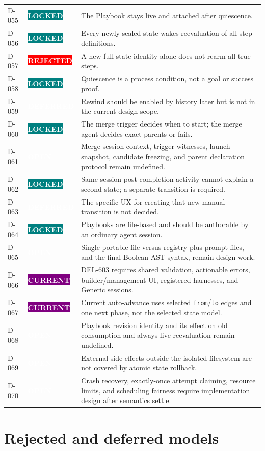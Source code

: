 \documentclass[11pt]{article}
\newcommand{\statuspill}[2]{%
  \begingroup\setlength{\fboxsep}{3pt}%
  \colorbox{#1}{\textcolor{white}{\sffamily\bfseries\scriptsize #2}}%
  \endgroup}
\newcommand{\Locked}{\statuspill{Teal}{LOCKED}}
\newcommand{\Current}{\statuspill{Purple}{CURRENT}}
\newcommand{\Open}{\statuspill{Amber}{OPEN}}
\newcommand{\Deferred}{\statuspill{Muted}{DEFERRED}}
\newcommand{\Rejected}{\statuspill{Red}{REJECTED}}
\begin{document}
\begin{longtable}{@{}L{0.52in}L{0.88in}L{5.10in}@{}}
D-055 & \Locked & The Playbook stays live and attached after quiescence. \\
D-056 & \Locked & Every newly sealed state wakes reevaluation of all step definitions. \\
D-057 & \Rejected & A new full-state identity alone does not rearm all true steps. \\
D-058 & \Locked & Quiescence is a process condition, not a goal or success proof. \\
D-059 & \Deferred & Rewind should be enabled by history later but is not in the current design scope. \\
D-060 & \Locked & The merge trigger decides when to start; the merge agent decides exact parents or fails. \\
D-061 & \Open & Merge session context, trigger witnesses, launch snapshot, candidate freezing, and parent declaration protocol remain undefined. \\
D-062 & \Locked & Same-session post-completion activity cannot explain a second state; a separate transition is required. \\
D-063 & \Deferred & The specific UX for creating that new manual transition is not decided. \\
D-064 & \Locked & Playbooks are file-based and should be authorable by an ordinary agent session. \\
D-065 & \Open & Single portable file versus registry plus prompt files, and the final Boolean AST syntax, remain design work. \\
D-066 & \Current & DEL-603 requires shared validation, actionable errors, builder/management UI, registered harnesses, and Generic sessions. \\
D-067 & \Current & Current auto-advance uses selected \texttt{from}/\texttt{to} edges and one next phase, not the selected state model. \\
D-068 & \Open & Playbook revision identity and its effect on old consumption and always-live reevaluation remain undefined. \\
D-069 & \Open & External side effects outside the isolated filesystem are not covered by atomic state rollback. \\
D-070 & \Open & Crash recovery, exactly-once attempt claiming, resource limits, and scheduling fairness require implementation design after semantics settle. \\
\bottomrule
\end{longtable}

\section{Rejected and deferred models}
\end{document}
